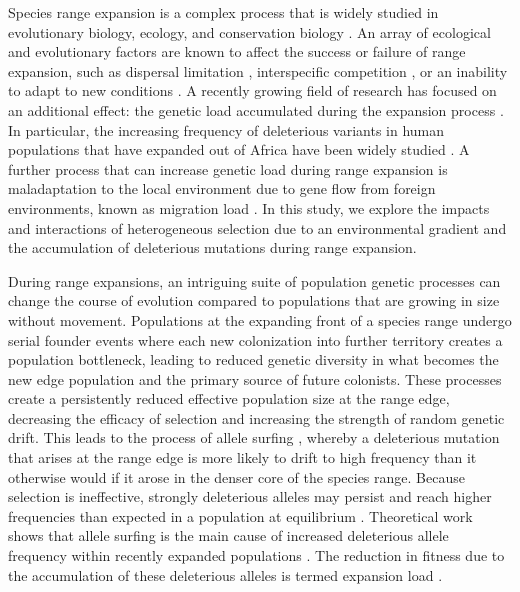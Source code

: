 Species range expansion is a complex process that is widely studied in evolutionary biology, ecology, and conservation biology \citep{Chen:2011, Colautti:2013, Hastings:2005, Phillips:2006, Excoffier:2009, Hallatschek:2010}. An array of ecological and evolutionary factors are known to affect the success or failure of range expansion, such as dispersal limitation \citep{Hargreaves:2014b, Marsico:2009, Hastings:2005}, interspecific competition \citep{Case:2000, Price:2009,Svenning:2014, Louthan:2015}, or an inability to adapt to new conditions \citep{Polechova:2015, Holt:2011, Angert:2008}. A recently growing field of research has focused on an additional effect: the genetic load accumulated during the expansion process \citep{Excoffier:2009, Hallatschek:2010, Peischl:2013, Peischl:2015, Peischl:2015b}. In particular, the increasing frequency of deleterious variants in human populations that have expanded out of Africa have been widely studied \citep{Henn:2015, Do:2015, Lohmueller:2008}. A further process that can increase genetic load during range expansion is maladaptation to the local environment due to gene flow from foreign environments, known as migration load \citep{Kirkpatrick:1997, Barton:2001, Polechova:2015}. In this study, we explore the impacts and interactions of heterogeneous selection due to an environmental gradient and the accumulation of deleterious mutations during range expansion.

During range expansions, an intriguing suite of population genetic processes can change the course of evolution compared to populations that are growing in size without movement. Populations at the expanding front of a species range undergo serial founder events where each new colonization into further territory creates a population bottleneck, leading to reduced genetic diversity in what becomes the new edge population and the primary source of future colonists. These processes create a persistently reduced effective population size at the range edge, decreasing the efficacy of selection and increasing the strength of random genetic drift. This leads to the process of allele surfing \citep{Klopfstein:2006}, whereby a deleterious mutation that arises at the range edge is more likely to drift to high frequency than it otherwise would if it arose in the denser core of the species range. Because selection is ineffective, strongly deleterious alleles may persist and reach higher frequencies than expected in a population at equilibrium \citep{Peischl:2015}. Theoretical work shows that allele surfing is the main cause of increased deleterious allele frequency within recently expanded populations \citep{Excoffier:2009}. The reduction in fitness due to the accumulation of these deleterious alleles is termed expansion load \citep{Peischl:2013,Peischl:2015}.

